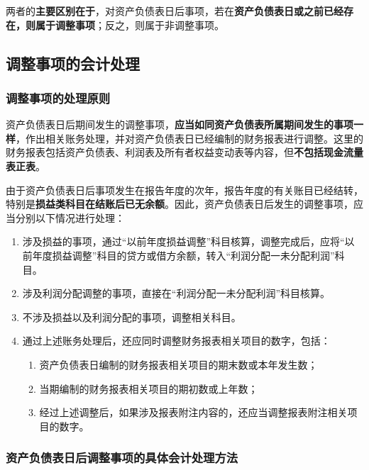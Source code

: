 \documentclass[UTF8,12pt]{ctexart}
\numberwithin{equation}{section} %
\numberwithin{figure}{section}
\numberwithin{table}{section}
\begin{document}
	两者的\textbf{主要区别在于}，对资产负债表日后事项，若在\textbf{资产负债表日或之前已经存在，则属于调整事项}；反之，则属于非调整事项。
	
	\subsection{调整事项的会计处理}
	\subsubsection{调整事项的处理原则}
	资产负债表日后期间发生的调整事项，\textbf{应当如同资产负债表所属期间发生的事项一样}，作出相关账务处理，并对资产负债表日已经编制的财务报表进行调整。这里的财务报表包括资产负债表、利润表及所有者权益变动表等内容，但\textbf{不包括现金流量表正表}。
	
	由于资产负债表日后事项发生在报告年度的次年，报告年度的有关账目已经结转，特别是\textbf{损益类科目在结账后已无余额}。因此，资产负债表日后发生的调整事项，应当分别以下情况进行处理：
	\begin{enumerate}
		\item 涉及损益的事项，通过“以前年度损益调整”科目核算，调整完成后，应将“以前年度损益调整”科目的贷方或借方余额，转入“利润分配一未分配利润”科目。
		
		\item 涉及利润分配调整的事项，直接在“利润分配一未分配利润”科目核算。
		
		\item 不涉及损益以及利润分配的事项，调整相关科目。
		
		\item 通过上述账务处理后，还应同时调整财务报表相关项目的数字，包括：
		\begin{enumerate}
			\item 资产负债表日编制的财务报表相关项目的期末数或本年发生数；
			
			\item 当期编制的财务报表相关项目的期初数或上年数；
			
			\item 经过上述调整后，如果涉及报表附注内容的，还应当调整报表附注相关项目的数字。
		\end{enumerate}
	\end{enumerate}
	
	\subsubsection{资产负债表日后调整事项的具体会计处理方法}
	
\end{document}
